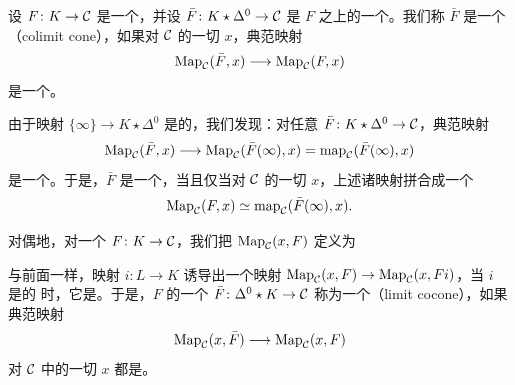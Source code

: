 \begin{definition}\label{def:colimit-cone}
设 $F\colon K \to \mathcal{C}$ 是一个\trFunctor{}，并设 $\bar{F}\colon K \star \Delta^0 \to \mathcal{C}$
是 $F$ 之上的一个\trCone{}。我们称 $\bar{F}$ 是一个\emph{\trColimit{}\trCone{}}（colimit
cone），如果对 $\mathcal{C}$ 的一切\trObject{} $x$，典范映射
\[
\mathrm{Map}_{\mathcal{C}}(\bar{F}, x) \longrightarrow \mathrm{Map}_{\mathcal{C}}(F, x)
\]
是一个\trHomotopyEquivalence{}。
\end{definition}

\begin{remark}\label{rem:colimit-cone-criterion}
由于映射 $\{\infty\} \to K \star \Delta^0$ 是\trRightAnodyne{}的，我们发现：对任意%
\trCone{} $\bar{F}\colon K \star \Delta^0 \to \mathcal{C}$，典范映射
\[
\mathrm{Map}_{\mathcal{C}}(\bar{F}, x) \longrightarrow
  \mathrm{Map}_{\mathcal{C}}(\bar{F}(\infty), x)
  = \mathrm{map}_{\mathcal{C}}(\bar{F}(\infty), x)
\]
是一个\trHomotopyEquivalence{}。于是，$\bar{F}$ 是一个\trColimit{}\trCone{}，当且仅当对
$\mathcal{C}$ 的一切\trObject{} $x$，上述诸映射拼合成一个\trHomotopyEquivalence{}%
\[
\mathrm{Map}_{\mathcal{C}}(F, x) \simeq \mathrm{map}_{\mathcal{C}}(\bar{F}(\infty), x).
\]
\end{remark}

\begin{definition}\label{def:limit-cocone}
对偶地，对一个\trFunctor{} $F\colon K \to \mathcal{C}$，我们把\trSimplicialSet{}%
$\mathrm{Map}_{\mathcal{C}}(x, F)$ 定义为\trPullback{}%
\begin{center}
\end{center}
与前面一样，映射 $i\colon L \to K$ 诱导出一个映射
$\mathrm{Map}_{\mathcal{C}}(x, F) \to \mathrm{Map}_{\mathcal{C}}(x, Fi)$，当 $i$ 是\trLeftAnodyne{}的
时，它是\trHomotopyEquivalence{}。于是，$F$ 的一个\trCocone{}%
$\bar{F}\colon \Delta^0 \star K \to \mathcal{C}$ 称为一个\emph{\trLimit{}\trCocone{}}（limit
cocone），如果典范映射
\[
\mathrm{Map}_{\mathcal{C}}(x, \bar{F}) \longrightarrow \mathrm{Map}_{\mathcal{C}}(x, F)
\]
对 $\mathcal{C}$ 中的一切 $x$ 都是\trHomotopyEquivalence{}。
\end{definition}


